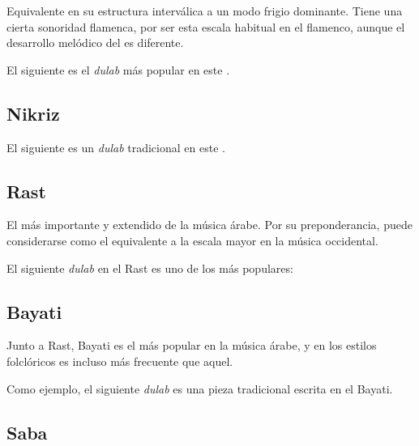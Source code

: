 Equivalente en su estructura interválica a un modo frigio dominante. Tiene una cierta sonoridad flamenca, por ser esta escala habitual en el flamenco, aunque el desarrollo melódico del \maqam es diferente.



El siguiente es el \emph{dulab} más popular en este \maqamb.




\subsection{\Maqam Nikriz}



El siguiente es un \emph{dulab} tradicional en este \maqamb.




\subsection{\Maqam Rast}

El \maqam más importante y extendido de la música árabe. Por su preponderancia, puede considerarse como el equivalente a la escala mayor en la música occidental.



El siguiente \emph{dulab} en el \maqam Rast es uno de los más populares:




\subsection{\Maqam Bayati}

Junto a Rast, Bayati es el \maqam más popular en la música árabe, y en los estilos folclóricos es incluso más frecuente que aquel.



Como ejemplo, el siguiente \emph{dulab} es una pieza tradicional escrita en el \maqam Bayati.




\subsection{\Maqam Saba}

